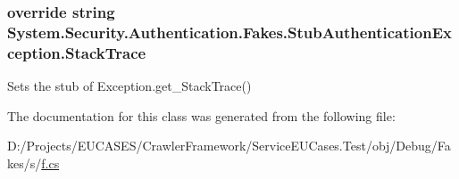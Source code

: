 \hypertarget{class_system_1_1_security_1_1_authentication_1_1_fakes_1_1_stub_authentication_exception_a3302a0104c86a9a997d0ccb8c493c18e}{
\subsubsection[{Stack\-Trace}]{\setlength{\rightskip}{0pt plus 5cm}override string System.\-Security.\-Authentication.\-Fakes.\-Stub\-Authentication\-Exception.\-Stack\-Trace\hspace{0.3cm}{\ttfamily [get]}}}\label{class_system_1_1_security_1_1_authentication_1_1_fakes_1_1_stub_authentication_exception_a3302a0104c86a9a997d0ccb8c493c18e}


Sets the stub of Exception.\-get\-\_\-\-Stack\-Trace()



The documentation for this class was generated from the following file\-:\begin{DoxyCompactItemize}
\item 
D\-:/\-Projects/\-E\-U\-C\-A\-S\-E\-S/\-Crawler\-Framework/\-Service\-E\-U\-Cases.\-Test/obj/\-Debug/\-Fakes/s/\hyperlink{s_2f_8cs}{f.\-cs}\end{DoxyCompactItemize}
